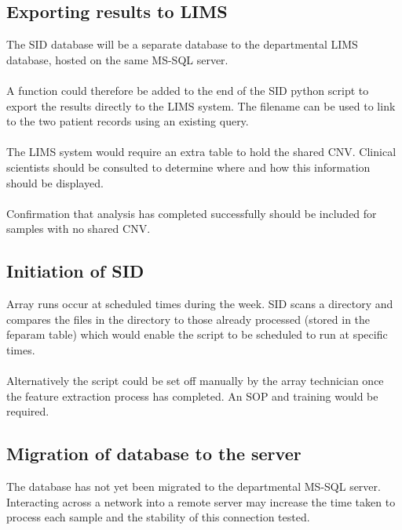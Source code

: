 \subsection{Exporting results to LIMS}
The SID database will be a separate database to the departmental LIMS database, hosted on the same MS-SQL server.
\paragraph*{}
A function could therefore be added to the end of the SID python script to export the results directly to the LIMS system. The filename can be used to link to the two patient records using an existing query.
\paragraph*{}
The LIMS system would require an extra table to hold the shared CNV. Clinical scientists should be consulted to determine where and how this information should be displayed.
\paragraph*{}
Confirmation that analysis has completed successfully should be included for samples with no shared CNV.

\subsection{Initiation of SID}
Array runs occur at scheduled times during the week. SID scans a directory and compares the files in the directory to those already processed (stored in the feparam table) which would enable the script to be scheduled to run at specific times.
\paragraph*{}
Alternatively the script could be set off manually by the array technician once the feature extraction process has completed. An SOP and training would be required.

\subsection{Migration of database to the server}
The database has not yet been migrated to the departmental MS-SQL server. Interacting across a network into a remote server may increase the time taken to process each sample and the stability of this connection tested.
